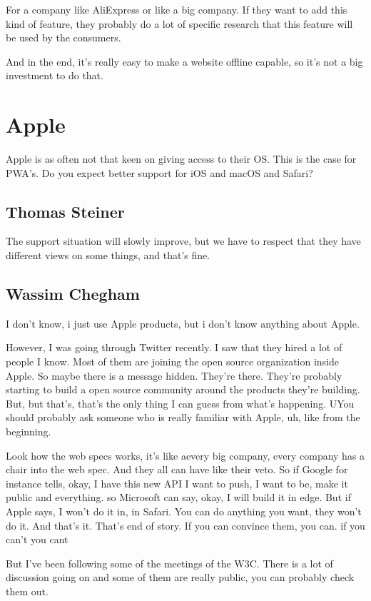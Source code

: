			For a company like AliExpress or like a big company. If they want to add this kind of feature, they probably do a lot of specific research that this feature will be used by the consumers.
			
			And in the end, it's really easy to make a website offline capable, so it's not a big investment to do that.
		
		
	\section{Apple}
		Apple is as often not that keen on giving access to their OS. This is the case for PWA's. Do you expect better support for iOS and macOS and Safari?
			
		\subsection{Thomas Steiner}
			The support situation will slowly improve, but we have to respect that they have different views on some things, and that’s fine.
		
		\subsection{Wassim Chegham}
			
			I don't know, i just use Apple products, but i don't know anything about Apple.
			
			However, I was going through Twitter recently. I saw that they hired a lot of people I know.   Most of them are joining the open source organization inside Apple. So maybe there is a message hidden. They're there. They're probably starting to build a open source community around the products they're building. But, but that's, that's the only thing I can guess from what's happening. UYou should probably ask someone who is really familiar with Apple, uh, like from the beginning.
			
			Look how the web specs works, it's like aevery big company, every company has  a chair into the web spec. And they all can have like their veto. So if Google for instance tells, okay, I have this new API I want to push, I want to be, make it public and everything. so Microsoft can say, okay, I will build it in edge. But if Apple says, I won't do it in, in Safari. You can do anything you want, they won't do it. And that's it. That's end of story. If you can convince them, you can. if you can't you cant
			
			But I've been following some of the meetings of the W3C. There is a lot of discussion going on and some of them are really public, you can probably check them out. 
			
